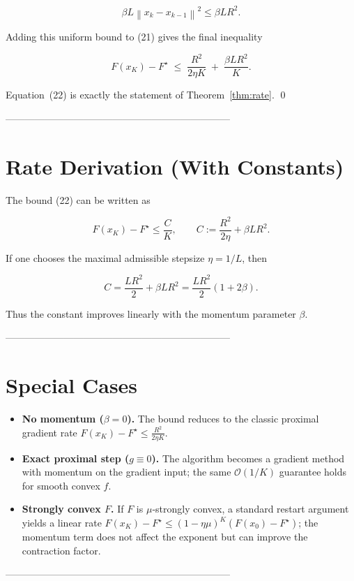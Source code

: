 \documentclass{article}
\newcommand{\norm}[1]{\left\lVert #1\right\rVert}
\begin{document}
\[
\beta L \norm{x_k-x_{k-1}}^{2}\le \beta L R^{2}.
\]

Adding this uniform bound to (21) gives the final inequality

\[
F(x_K)-F^\star \;\le\; \frac{R^{2}}{2\eta K}\;+\;\frac{\beta L R^{2}}{K}.
\tag{22}
\]

Equation~(22) is exactly the statement of Theorem~\ref{thm:rate}. \qed

---------------------------------------------------------------------

\section*{Rate Derivation (With Constants)}
The bound (22) can be written as  

\[
F(x_K)-F^\star \le \frac{C}{K},
\qquad 
C:=\frac{R^{2}}{2\eta}+ \beta L R^{2}.
\]

If one chooses the maximal admissible stepsize $\eta=1/L$, then  

\[
C = \frac{L R^{2}}{2}+ \beta L R^{2}= \frac{L R^{2}}{2}(1+2\beta).
\]

Thus the constant improves linearly with the momentum parameter $\beta$.

---------------------------------------------------------------------

\section*{Special Cases}
\begin{itemize}
\item \textbf{No momentum ($\beta=0$).} The bound reduces to the classic proximal gradient rate $F(x_K)-F^\star\le \frac{R^{2}}{2\eta K}$.
\item \textbf{Exact proximal step ($g\equiv0$).} The algorithm becomes a gradient method with momentum on the gradient input; the same $\mathcal O(1/K)$ guarantee holds for smooth convex $f$.
\item \textbf{Strongly convex $F$.} If $F$ is $\mu$‑strongly convex, a standard restart argument yields a linear rate $F(x_K)-F^\star\le (1-\eta\mu)^{K} (F(x_0)-F^\star)$; the momentum term does not affect the exponent but can improve the contraction factor.
\end{itemize}

---------------------------------------------------------------------
\end{document}
